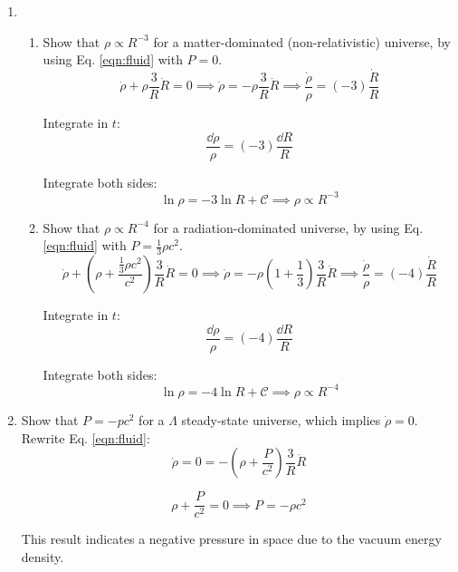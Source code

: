 \documentclass{paper}
\begin{document}
\begin{enumerate}
\begin{enumerate}
        \item
          \begin{enumerate}
            \item
              Show that \(\rho \propto R^{-3}\) for a matter-dominated
              (non-relativistic) universe, by using Eq. \ref{eqn:fluid} 
              with \(P=0\).
              \[
                \dot{\rho} + \rho \frac{3}{R} \dot{R} = 0
                \implies \dot{\rho} = - \rho \frac{3}{R} \dot{R}
                \implies \frac{\dot{\rho}}{\rho} = (-3)\frac{\dot{R}}{R}
              \]

              Integrate in \(t\):
              \[
                \frac{\dd{\rho}}{\rho} = (-3)\frac{\dd{R}}{R}
              \]

              Integrate both sides:
              \[
                \ln{\rho} = -3 \ln{R}+\mathcal{C} \implies \rho \propto R^{-3}
              \]

            \item
              Show that \(\rho \propto R^{-4}\) for a radiation-dominated
              universe, by using Eq. \ref{eqn:fluid} with 
              \(P=\frac{1}{3}\rho c^2\).
              \[
                \dot{\rho} + ( \rho +\frac{\frac{1}{3}\rho c^2}{c^2} ) 
                \frac{3}{R} \dot{R} = 0
                \implies
                \dot{\rho} = -\rho(1 + \frac{1}{3})\frac{3}{R}\dot{R}
                \implies
                \frac{\dot{\rho}}{\rho} = (-4)\frac{\dot{R}}{R}
              \]

              Integrate in \(t\):
              \[
                \frac{\dd{\rho}}{\rho} = (-4)\frac{\dd{R}}{R}
              \]

              Integrate both sides:
              \[
                \ln{\rho} = -4 \ln{R}+\mathcal{C} \implies \rho \propto R^{-4}
              \]

          \end{enumerate}

        \item
          Show that \(P = - p c^2\) for a \(\Lambda\) steady-state universe,
          which implies \(\dot{\rho} = 0\). Rewrite Eq. \ref{eqn:fluid}:
          \[
            \dot{\rho} = 0 
            = - \left(\rho + \frac{P}{c^2}\right)\frac{3}{R}\dot{R}
          \]

          \[
            \rho + \frac{P}{c^2} = 0  \implies P = - \rho c^2
          \]

          This result indicates a negative pressure in space due to the 
          vacuum energy density.


\end{enumerate}
\end{enumerate}
\end{document}
